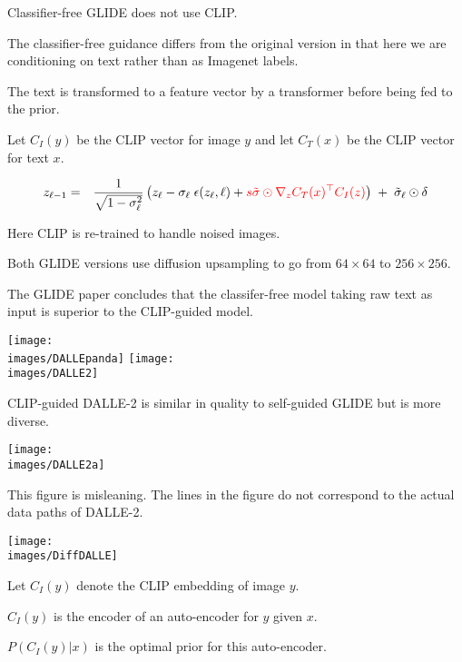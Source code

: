 {\vfill
Classifier-free GLIDE does not use CLIP.

\vfill
The classifier-free guidance differs from the original version in that here we are conditioning on text
rather than as Imagenet labels.

\vfill
The text is transformed to a feature vector by a transformer before being fed to the prior.


Let $C_I(y)$ be the CLIP vector for image $y$ and let $C_T(x)$ be the CLIP vector for text $x$.

{\huge
\begin{eqnarray*}
z_{\ell-1}  & = & \frac{1}{\sqrt{1-\sigma_\ell^2}}\left(z_\ell - \sigma_\ell\; \epsilon(z_\ell,\ell) + {\color{red} s \tilde{\sigma}\odot\nabla_{z} C_T(x)^\top C_I(z)}\right)\; +\; \tilde{\sigma}_\ell\odot\delta
\end{eqnarray*}
}

\vfill
Here CLIP is re-trained to handle noised images.


Both GLIDE versions use diffusion upsampling to go from $64 \times 64$ to $256 \times 256$.

\vfill
The GLIDE paper concludes that the classifer-free model taking raw text as input is superior to the CLIP-guided model.


\centerline{\hfill \texttt{[image: \\images/DALLEpanda]} \hfill \texttt{[image: \\images/DALLE2]}}

CLIP-guided DALLE-2 is similar in quality to self-guided GLIDE but is more diverse.


\vfill
\centerline{\texttt{[image: \\images/DALLE2a]}}

This figure is misleaning.  The lines in the figure do not correspond to the actual data paths of DALLE-2.


\centerline{\texttt{[image: \\images/DiffDALLE]}}

\vfill
Let $C_I(y)$ denote the CLIP embedding of image $y$.

\vfill
$C_I(y)$ is the encoder of an auto-encoder for $y$ given $x$.

\vfill
$P(C_I(y)|x)$ is the optimal prior for this auto-encoder.

}
